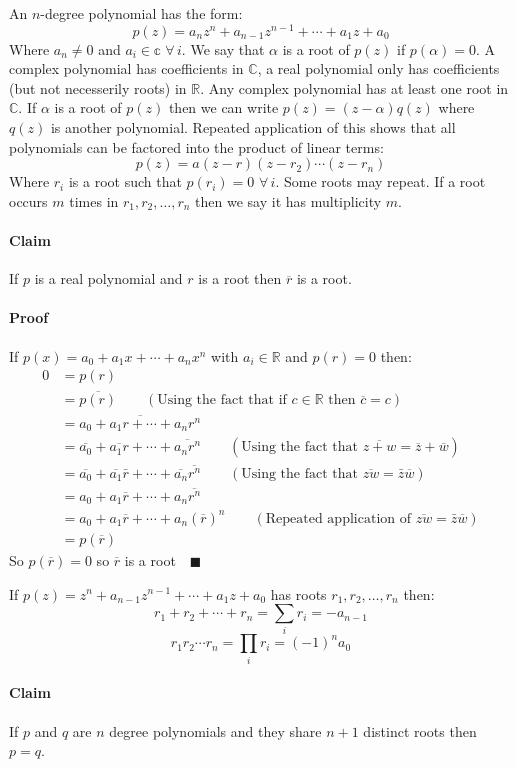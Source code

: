 \documentclass{article}
\newcommand{\cc}[1]{\overline{#1}}
\newcommand{\bb}[1]{\mathbb{#1}}
\newcommand{\A}{\,\forall\,}
\begin{document}
An \(n\)-degree polynomial has the form:
\[p(z)=a_nz^n+a_{n-1}z^{n-1}+\dotsb+a_1z+a_0\]
Where \(a_n\ne0\) and \(a_i\in\bb c\,\A i\). We say that \(\alpha\) is a root of \(p(z)\) if \(p(\alpha)=0\). A complex polynomial has coefficients in \(\bb C\), a real polynomial only has coefficients (but not necesserily roots) in \(\bb R\). Any complex polynomial has at least one root in \(\bb C\). If \(\alpha\) is a root of \(p(z)\) then we can write \(p(z)=(z-\alpha)q(z)\) where \(q(z)\) is another polynomial. Repeated application of this shows that all polynomials can be factored into the product of linear terms:
\[p(z)=a(z-r)(z-r_2)\dotsm(z-r_n)\]
Where \(r_i\) is a root such that \(p(r_i)=0\,\A i\). Some roots may repeat. If a root occurs \(m\) times in \(r_1,r_2,\dotsc,r_n\) then we say it has multiplicity \(m\).

\paragraph{Claim} If \(p\) is a real polynomial and \(r\) is a root then \(\cc r\) is a root.

\paragraph{Proof} If \(p(x)=a_0+a_1x+\dotsb+a_nx^n\) with \(a_i\in\bb R\) and \(p(r)=0\) then:
\begin{align*}
0&=p(r)\\
&=\cc{p(r)}\qquad(\text{Using the fact that if \(c\in\bb R\) then \(\cc c=c\)})\\
&=\cc{a_0+a_1r+\dotsb+a_nr^n}\\
&=\cc{a_0}+\cc{a_1r}+\dotsb+\cc{a_nr^n}\qquad(\text{Using the fact that \(\cc{z+w}=\cc z+\cc w\)})\\
&=\cc{a_0}+\cc{a_1}\bar r+\dotsb+\cc{a_n}\cc{r^n}\qquad(\text{Using the fact that \(\cc{zw}=\bar z\cc w\)})\\
&=a_0+a_1\cc r+\dotsb+a_n\cc{r^n}\\
&=a_0+a_1\cc r+\dotsb+a_n(\cc r)^n\qquad(\text{Repeated application of \(\cc{zw}=\bar z\cc w\)})\\
&=p(\cc r)
\end{align*}
So \(p(\cc r)=0\) so \(\cc r\) is a root\(\quad\blacksquare\)

If \(p(z)=z^n+a_{n-1}z^{n-1}+\dotsb+a_1z+a_0\) has roots \(r_1,r_2,\dotsc,r_n\) then:
\[r_1+r_2+\dotsb+r_n=\sum_ir_i=-a_{n-1}\]
\[r_1r_2\dotsm r_n=\prod_ir_i=(-1)^na_0\]

\paragraph{Claim} If \(p\) and \(q\) are \(n\) degree polynomials and they share \(n+1\) distinct roots then \(p=q\).
\end{document}
